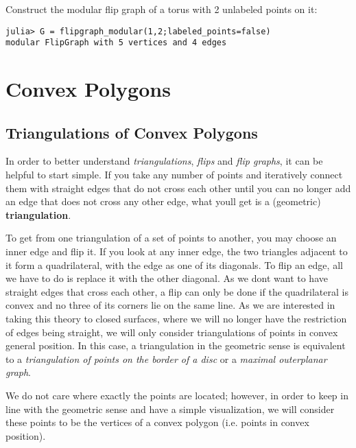 Construct the modular flip graph of a torus with 2 unlabeled points on it:




\begin{verbatim}
julia> G = flipgraph_modular(1,2;labeled_points=false)
modular FlipGraph with 5 vertices and 4 edges
\end{verbatim}



\part{Convex Polygons}


\chapter{Triangulations of Convex Polygons}



\label{10883852251054835207}{}


In order to better understand \emph{triangulations}, \emph{flips} and \emph{flip graphs}, it can be helpful to start simple. If you take any number of points and iteratively connect them with straight edges that do not cross each other  until you can no longer add an edge that does not cross any other edge, what you{\textquotesingle}ll get is a (geometric) \textbf{triangulation}.



To get from one triangulation of a set of points to another, you may choose an inner edge and flip it.  If you look at any inner edge, the two triangles adjacent to it form a quadrilateral, with the edge as one of its diagonals. To flip an edge, all we have to do is replace it with the other diagonal.  As we don{\textquotesingle}t want to have straight edges that cross each other, a flip can only be done if the quadrilateral is convex and no three of its corners lie on the same line. As we are interested in taking this theory to closed surfaces, where we will no longer have the restriction of edges being straight, we will only consider triangulations of points in convex general position. In this case, a triangulation in the geometric sense is equivalent to a \emph{triangulation of points on the border of a disc} or a \emph{maximal outerplanar graph}.



We do not care where exactly the points are located; however, in order to keep in line with the geometric sense and have a simple visualization, we will consider these points to be the vertices of a convex polygon (i.e. points in convex position). 



